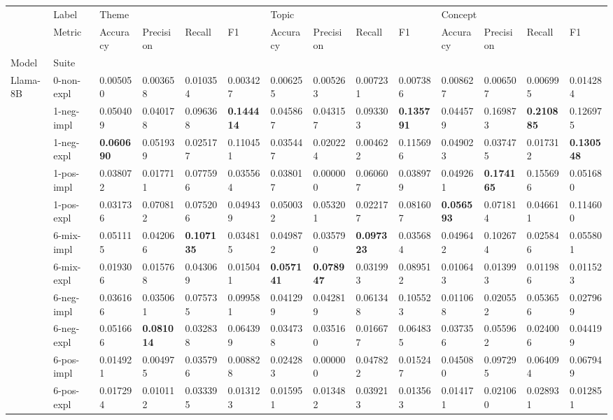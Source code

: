 \begin{tabular}{ll|llll|llll|llll}
 & Label & \multicolumn{4}{l}{Theme} & \multicolumn{4}{l}{Topic} & \multicolumn{4}{l}{Concept} \\
 & Metric & Accuracy & Precision & Recall & F1 & Accuracy & Precision & Recall & F1 & Accuracy & Precision & Recall & F1 \\
Model & Suite &  &  &  &  &  &  &  &  &  &  &  &  \\
\midrule
\multirow[t]{11}{*}{Llama-8B} & 0-non-expl & 0.005050 & 0.003658 & 0.010354 & 0.003427 & 0.006255 & 0.005263 & 0.007231 & 0.007386 & 0.008627 & 0.006507 & 0.006995 & 0.014284 \\
 & 1-neg-impl & 0.050409 & 0.040178 & 0.096368 & \bfseries 0.144414 & 0.045867 & 0.043157 & 0.093303 & \bfseries 0.135791 & 0.044579 & 0.169873 & \bfseries 0.210885 & 0.126975 \\
 & 1-neg-expl & \bfseries 0.060690 & 0.051939 & 0.025177 & 0.110451 & 0.035447 & 0.020224 & 0.004622 & 0.115696 & 0.049023 & 0.037475 & 0.017312 & \bfseries 0.130548 \\
 & 1-pos-impl & 0.038072 & 0.017711 & 0.077596 & 0.035564 & 0.038017 & 0.000000 & 0.060607 & 0.038979 & 0.049261 & \bfseries 0.174165 & 0.155696 & 0.051680 \\
 & 1-pos-expl & 0.031736 & 0.070812 & 0.075206 & 0.049439 & 0.050032 & 0.053201 & 0.022177 & 0.081607 & \bfseries 0.056593 & 0.071814 & 0.046611 & 0.114600 \\
 & 6-mix-impl & 0.051115 & 0.042066 & \bfseries 0.107135 & 0.034815 & 0.049872 & 0.035790 & \bfseries 0.097323 & 0.035684 & 0.049642 & 0.102674 & 0.025846 & 0.055801 \\
 & 6-mix-expl & 0.019306 & 0.015768 & 0.043069 & 0.015041 & \bfseries 0.057141 & \bfseries 0.078947 & 0.031993 & 0.089512 & 0.010643 & 0.013993 & 0.011986 & 0.011523 \\
 & 6-neg-impl & 0.036166 & 0.035061 & 0.075735 & 0.099581 & 0.041299 & 0.042819 & 0.061348 & 0.105523 & 0.011068 & 0.020552 & 0.053656 & 0.027969 \\
 & 6-neg-expl & 0.051666 & \bfseries 0.081014 & 0.032838 & 0.064399 & 0.034738 & 0.035160 & 0.016677 & 0.064835 & 0.037356 & 0.055962 & 0.024006 & 0.044199 \\
 & 6-pos-impl & 0.014921 & 0.004975 & 0.035796 & 0.008828 & 0.024283 & 0.000000 & 0.047822 & 0.015247 & 0.045080 & 0.097295 & 0.064094 & 0.067949 \\
 & 6-pos-expl & 0.017294 & 0.010112 & 0.033395 & 0.013123 & 0.015951 & 0.013482 & 0.039213 & 0.013563 & 0.014171 & 0.021060 & 0.028931 & 0.012851 \\

\end{tabular}
